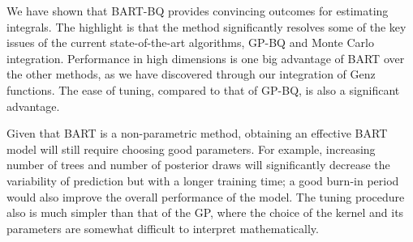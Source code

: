 





We have shown that BART-BQ provides convincing outcomes for estimating integrals. The highlight is that the method significantly resolves some of the key issues of the current state-of-the-art algorithms, GP-BQ and Monte Carlo integration. Performance in high dimensions is one big advantage of BART over the other methods, as we have discovered through our integration of Genz functions. The ease of tuning, compared to that of GP-BQ, is also a significant advantage.

Given that BART is a non-parametric method, obtaining an effective BART model will still require choosing good parameters. For example, increasing number of trees and number of posterior draws will significantly decrease the variability of prediction but with a longer training time; a good burn-in period would also improve the overall performance of the model. The tuning procedure also is much simpler than that of the GP, where the choice of the kernel and its parameters are somewhat difficult to interpret mathematically. 

